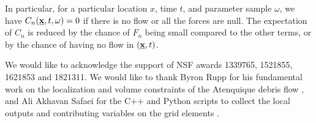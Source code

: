 \documentclass[nhess, manuscript]{copernicus}
\begin{document}
In particular, for a particular location $x$, time $t$, and parameter sample $\omega$, we have $C_n(\underline{\textbf x},t,\omega)=0$ if there is no flow or all the forces are null. The expectation of $C_n$ is reduced by the chance of $F_n$ being small compared to the other terms, or by the chance of having no flow in $(\underline{\textbf x},t)$.

\noappendix



\begin{acknowledgements}
We would like to acknowledge the support of NSF awards 1339765, 1521855, 1621853 and 1821311. We would like to thank Byron Rupp for his fundamental work on the localization and volume constraints of the Atenquique debris flow \citep{Rupp2004}, and Ali Akhavan Safaei for the C++ and Python scripts to collect the local outputs and contributing variables on the grid elements \citep{Ali2018}.
\end{acknowledgements}



\end{document}
